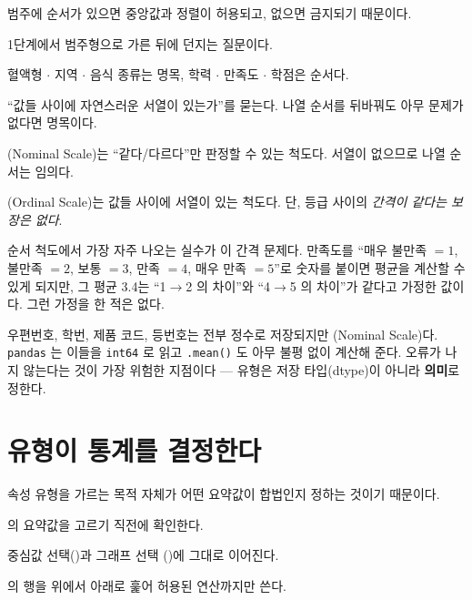 \begin{inbrief}
  \item[Why] 범주에 순서가 있으면 중앙값과 정렬이 허용되고, 없으면 금지되기
             때문이다.
  \item[When] 1단계에서 범주형으로 가른 뒤에 던지는 질문이다.
  \item[Where] 혈액형 $\cdot$ 지역 $\cdot$ 음식 종류는 명목, 학력 $\cdot$ 만족도
               $\cdot$ 학점은 순서다.
  \item[How] ``값들 사이에 자연스러운 서열이 있는가''를 묻는다. 나열 순서를
             뒤바꿔도 아무 문제가 없다면 명목이다.
\end{inbrief}

\begin{definition}[명목 척도와 순서 척도]
\label{def:nominal-ordinal}
(Nominal Scale)는 ``같다/다르다''만 판정할 수 있는 척도다.
서열이 없으므로 나열 순서는 임의다.

(Ordinal Scale)는 값들 사이에 서열이 있는 척도다. 단, 등급
사이의 \emph{간격이 같다는 보장은 없다}.
\end{definition}

순서 척도에서 가장 자주 나오는 실수가 이 간격 문제다. 만족도를
``매우 불만족 $=1$, 불만족 $=2$, 보통 $=3$, 만족 $=4$, 매우 만족 $=5$''로
숫자를 붙이면 평균을 계산할 수 있게 되지만, 그 평균 3.4는
``1$\to$2 의 차이''와 ``4$\to$5 의 차이''가 같다고 가정한 값이다. 그런 가정을
한 적은 없다.

\begin{pitfall}
우편번호, 학번, 제품 코드, 등번호는 전부 정수로 저장되지만 (Nominal Scale)다. \texttt{pandas} 는 이들을 \texttt{int64} 로 읽고
\texttt{.mean()} 도 아무 불평 없이 계산해 준다. 오류가 나지 않는다는 것이
가장 위험한 지점이다 --- 유형은 저장 타입(dtype)이 아니라 \textbf{의미}로
정한다.
\end{pitfall}

\section{유형이 통계를 결정한다}
\label{sec:attr-stats}

\begin{inbrief}
  \item[Why] 속성 유형을 가르는 목적 자체가 어떤 요약값이 합법인지 정하는
             것이기 때문이다.
  \item[When] 의 요약값을 고르기 직전에 확인한다.
  \item[Where] 중심값 선택()과 그래프 선택
               ()에 그대로 이어진다.
  \item[How]  의 행을 위에서 아래로 훑어 허용된 연산까지만
             쓴다.
\end{inbrief}

